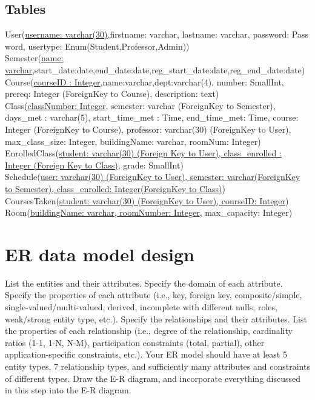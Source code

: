 \documentclass[11pt,oneside,a4paper]{article}
\begin{document}
\subsection{Tables}
User(\underline{username: varchar(30)},firstname: varchar, lastname: varchar,
password: Pass	word, usertype: Enum(Student,Professor,Admin))
\\
Semester(\underline{name: varchar},start\_date:date,end\_date:date,reg\_start\_date:date,reg\_end\_date:date)
\\
Course(\underline{courseID	: Integer},name:varchar,dept:varchar(4), number:
SmallInt, prereq: Integer (ForeignKey to Course), description: text)
\\
Class(\underline{classNumber: Integer}, semester: varchar (ForeignKey to
Semester), days\_met : varchar(5), start\_time\_met : Time, end\_time\_met:
Time, course: Integer (ForeignKey to Course), professor: varchar(30)
(ForeignKey to User), max\_class\_size: Integer, buildingName: varchar,
roomNum: Integer)
\\
EnrolledClass(\underline{student: varchar(30) (Foreign Key to User), class\_enrolled : Integer (Foreign Key to Class)}, grade: SmallInt)
\\
Schedule(\underline{user: varchar(30) (ForeignKey to User), semester: varchar(ForeignKey to Semester), class\_enrolled: Integer(ForeignKey to Class)})
\\
CoursesTaken(\underline{student: varchar(30) (ForeignKey to User), courseID: Integer}) \\
Room(\underline{buildingName: varchar, roomNumber: Integer}, max\_capacity:
Integer)

		
	
\section{ER data model design}
List the entities and their attributes. Specify the domain of each attribute. Specify the properties of each attribute (i.e., key, foreign key, composite/simple, single-valued/multi-valued, derived, incomplete with different nulls, roles, weak/strong entity type, etc.). Specify the relationships and their attributes. List the properties of each relationship (i.e., degree of the relationship, cardinality ratios (1-1, 1-N, N-M), participation constraints (total, partial), other application-specific constraints, etc.). Your ER model should have at least 5 entity types, 7 relationship types, and sufficiently many attributes and constraints of different types. Draw the E-R diagram, and incorporate everything discussed in this step into the E-R diagram. 
\end{document}
